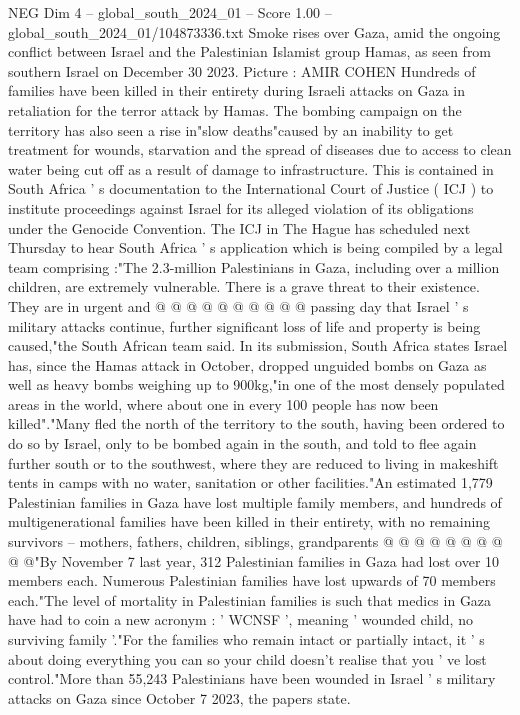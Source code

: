 \begin{textsample}{NEG Dim 4 – global\_south\_2024\_01 – Score 1.00 – global\_south\_2024\_01/104873336.txt}  \label{ex:f4_neg_090}
Smoke rises over Gaza, amid the ongoing conflict between Israel and the Palestinian Islamist group Hamas, as seen from southern Israel on December 30 2023.
Picture : AMIR COHEN Hundreds of families have been killed in their entirety during Israeli attacks on Gaza in retaliation for the terror attack by Hamas.
The bombing campaign on the territory has also seen a rise in"slow deaths"caused by an inability to get treatment for wounds, starvation and the spread of diseases due to access to clean water being cut off as a result of damage to infrastructure.
This is contained in South Africa ' s documentation to the International Court of Justice ( ICJ ) to institute proceedings against Israel for its alleged violation of its obligations under the Genocide Convention.
The ICJ in The Hague has scheduled next Thursday to hear South Africa ' s application which is being compiled by a legal team comprising :"The 2.3-million Palestinians in Gaza, including over a million children, are extremely vulnerable.
There is a grave threat to their existence.
They are in urgent and @ @ @ @ @ @ @ @ @ @ passing day that Israel ' s military attacks continue, further significant loss of life and property is being caused,"the South African team said.
In its submission, South Africa states Israel has, since the Hamas attack in October, dropped unguided bombs on Gaza as well as heavy bombs weighing up to 900kg,"in one of the most densely populated areas in the world, where about one in every 100 people has now been killed"."Many fled the north of the territory to the south, having been ordered to do so by Israel, only to be bombed again in the south, and told to flee again further south or to the southwest, where they are reduced to living in makeshift tents in camps with no water, sanitation or other facilities."An estimated 1,779 Palestinian families in Gaza have lost multiple family members, and hundreds of multigenerational families have been killed in their entirety, with no remaining survivors -- mothers, fathers, children, siblings, grandparents @ @ @ @ @ @ @ @ @ @"By November 7 last year, 312 Palestinian families in Gaza had lost over 10 members each.
Numerous Palestinian families have lost upwards of 70 members each."The level of mortality in Palestinian families is such that medics in Gaza have had to coin a new acronym : ' WCNSF ', meaning ' wounded child, no surviving family '."For the families who remain intact or partially intact, it ' s about doing everything you can so your child doesn't realise that you ' ve lost control."More than 55,243 Palestinians have been wounded in Israel ' s military attacks on Gaza since October 7 2023, the papers state.

\end{textsample}
